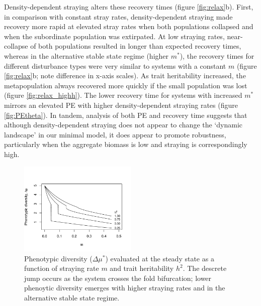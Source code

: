\documentclass[twocolumn,preprintnumbers,amsmath,amssymb,superscriptaddress]{revtex4}
\begin{document}
Density-dependent straying alters these recovery times (figure \ref{fig:relax}b). 
First, in comparison with constant stray rates, density-dependent straying made recovery more rapid at elevated stray rates when both populations collapsed and when the subordinate population was extirpated.
At low straying rates, near-collapse of both populations resulted in longer than expected recovery times, whereas in the alternative stable state regime (higher $m^*$), the recovery times for different disturbance types were very similar to systems with a constant $m$ (figure \ref{fig:relax}b; note difference in x-axis scales).
As trait heritability increased, the metapopulation always recovered more quickly if the small population was lost (figure \ref{fig:relax_highh}).
The lower recovery time for systems with increased $m^*$ mirrors an elevated PE with higher density-dependent straying rates (figure \ref{fig:PEtheta}).
In tandem, analysis of both PE and recovery time suggests that although density-dependent straying does not appear to change the `dynamic landscape' in our minimal model, it does appear to promote robustness, particularly when the aggregate biomass is low and straying is correspondingly high.



\begin{figure}
  \captionsetup{justification=raggedright,
singlelinecheck=false
}
\centering
\includegraphics[width=0.5\textwidth]{figs2/fig_traitdiff.pdf}
\caption{
Phenotypic diversity ($\Delta \mu^*$) evaluated at the steady state as a function of straying rate $m$ and trait heritability $h^2$. The descrete jump occurs as the system crosses the fold bifurcation; lower phenoytic diversity emerges with higher straying rates and in the alternative stable state regime. 
} \label{fig:traitdiff}
\end{figure}
\end{document}
